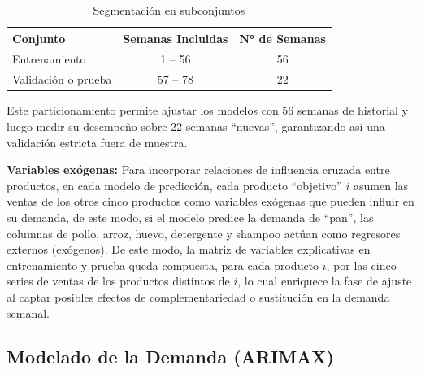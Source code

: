 \documentclass[12pt]{article}
\begin{document}
\begin{table}[H]
\centering
\caption{Segmentación en subconjuntos}
\label{tabla:segmentacion}
\begin{tabular}{|l|c|c|}
\hline
Conjunto            & Semanas Incluidas & N° de Semanas \\ \hline
Entrenamiento       & 1 – 56            & 56            \\ \hline
Validación o prueba & 57 – 78           & 22            \\ \hline
\end{tabular}
\end{table}
\vspace{0.5cm}
Este particionamiento permite ajustar los modelos con 56 semanas de historial y luego medir su desempeño sobre 22 semanas “nuevas”, garantizando así una validación estricta fuera de muestra.

\vspace{0.5cm}

\textbf{Variables exógenas:} 
Para incorporar relaciones de influencia cruzada entre productos, en cada modelo de predicción, cada producto “objetivo” $i$ asumen las ventas de los otros cinco productos como variables exógenas que pueden influir en su demanda, de este modo, si el modelo predice la demanda de “pan”, las columnas de pollo, arroz, huevo, detergente y shampoo actúan como regresores externos (exógenos). De este modo, la matriz de variables explicativas en entrenamiento y prueba queda compuesta, para cada producto $i$, por las cinco series de ventas de los productos distintos de $i$, lo cual enriquece la fase de ajuste al captar posibles efectos de complementariedad o sustitución en la demanda semanal. 


\vspace{0.5cm}
\subsection{Modelado de la Demanda (ARIMAX)}
\end{document}
